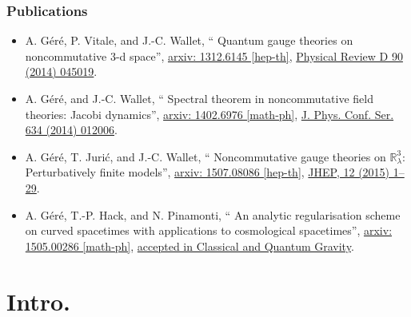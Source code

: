 \documentclass[9pt]{beamer}
\newcommand\paper[1]{\def\insertpaper{#1}}
\renewcommand{\paper}[6]{#1, ``#2'', \href{#4}{arxiv: #3}, \href{http://dx.doi.org/#6}{#5}.}
\begin{document}
\begin{frame}

\frametitle{Publications}

\begin{itemize}

\item
\paper{%
A. Géré, P. Vitale, and J.-C. Wallet}{%
Quantum gauge theories on noncommutative 3-d space}{%
1312.6145 [hep-th]}{%
http://arxiv.org/abs/1312.6145}{%
Physical Review D 90 (2014) 045019}{%
10.1103/PhysRevD.90.045019}%

\item
\paper{%
A. Géré, and J.-C. Wallet}{%
Spectral theorem in noncommutative field theories: Jacobi dynamics}{%
1402.6976 [math-ph]}{%
http://arxiv.org/abs/1402.6976}{%
J. Phys. Conf. Ser. 634 (2014) 012006}{%
10.1088/1742-6596/634/1/012006}

\item
\paper{%
A. Géré, T. Jurić, and J.-C. Wallet}{%
Noncommutative gauge theories on $\mathbb{R}^3_\lambda$: Perturbatively finite models}{%
1507.08086 [hep-th]}{%
http://arxiv.org/abs/1507.08086}{%
JHEP, 12 (2015) 1--29}{%
10.1007/JHEP12(2015)045}%

\item
\vspace*{-20pt}
\begin{block}{\vspace*{-3ex}}
\vspace*{-5pt}
\paper{%
A. Géré, T.-P. Hack, and N. Pinamonti}{%
An analytic regularisation scheme on curved spacetimes with applications to cosmological spacetimes}{%
1505.00286 [math-ph]}{%
http://arxiv.org/abs/1505.00286}{%
accepted in Classical and Quantum Gravity}{%
http://iopscience.iop.org/0264-9381/}%
\end{block}

\end{itemize}

\end{frame}

\section{Intro.} 
\end{document}
